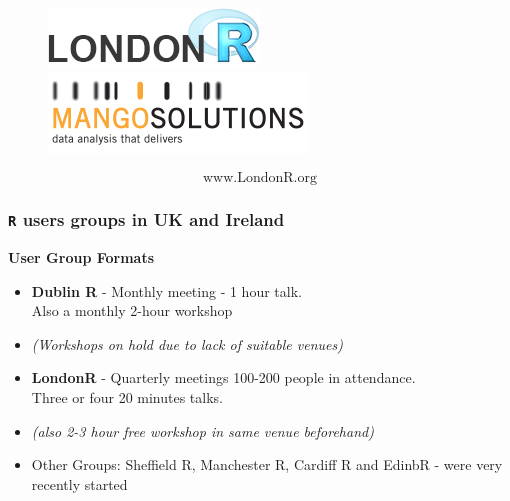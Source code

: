 \documentclass{beamer}
\begin{document}
\begin{frame}
	
\begin{figure}
\centering
\includegraphics[width=0.85\linewidth]{LondonRlogo}\\
\includegraphics[width=0.55\linewidth]{mangosolutions}
\end{figure}


\Large
\[ \mbox{www.LondonR.org} \]

\end{frame}

\begin{frame}

\frametitle{\texttt{R} users groups in UK and Ireland}
\large
	\textbf{User Group Formats}
	\begin{itemize}

	\item \textbf{Dublin R} - Monthly meeting  - 1 hour talk. \\ Also a monthly 2-hour workshop
	\item  \textit{(Workshops on hold due to lack of suitable venues)}
		\item \textbf{LondonR} - Quarterly meetings 100-200 people in attendance. \\ Three or four 20 minutes talks.
		\item \textit{(also 2-3 hour free workshop in same venue beforehand)}	
	\item Other Groups: Sheffield R, Manchester R, Cardiff R and EdinbR - were very recently started
	\end{itemize}
\end{frame}
\end{document}
